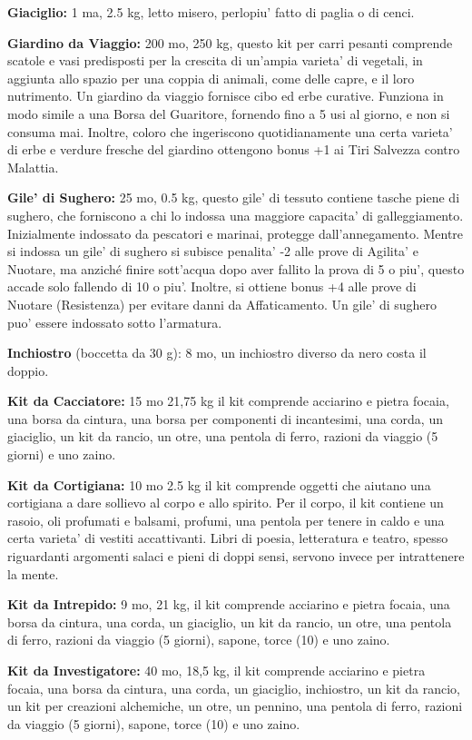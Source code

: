 \documentclass[a4paper,11pt,twoside,openany]{dndbook}
\begin{document}
{\textbf{Giaciglio:} 1 ma, 2.5 kg, letto misero, perlopiu' fatto di paglia o di cenci.

\textbf{Giardino da Viaggio:} 200 mo, 250 kg, questo kit per carri pesanti comprende scatole e vasi predispo­sti per la crescita di un'ampia varieta' di vegetali, in aggiunta allo spazio per una coppia di animali, come delle capre, e il loro nutrimento. Un giardino da viaggio fornisce cibo ed erbe curative. Funziona in modo simile a una Borsa del Guaritore, fornendo fino a 5 usi al giorno, e non si consuma mai. Inoltre, coloro che ingeriscono quotidianamente una certa varieta' di ­erbe e verdure fresche del giardino ottengono bonus +1 ai Tiri Salvezza contro Malattia. 

\textbf{Gile' di Sughero:} 25 mo, 0.5 kg, questo gile' di tessuto contiene tasche piene di sughero, che forniscono a chi lo indossa una maggiore capacita' di galleggiamento. Inizialmente indossato da pescatori e marinai, protegge dall'annegamento. Mentre si indossa un gile' di sughero si subisce penalita' -2 alle prove di Agilita' e Nuotare, ma anziché finire sott'acqua dopo aver fallito la prova di 5 o piu', questo accade solo fallendo di 10 o piu'. Inoltre, si ottiene bonus +4 alle prove di Nuotare (Resistenza) per evitare danni da Affaticamento. Un gile' di sughero puo' essere indossato sotto l'armatura.

\textbf{Inchiostro} (boccetta da 30 g): 8 mo, un inchiostro diverso da nero costa il doppio.

\textbf{Kit da Cacciatore:} 15 mo 21,75 kg il kit comprende acciarino e pietra focaia, una borsa da cin­tura, una borsa per componenti di incantesimi, una corda, un giaciglio, un kit da rancio, un otre, una pentola di ferro, razioni da viaggio (5 giorni) e uno zaino.

\textbf{Kit da Cortigiana:} 10 mo 2.5 kg il kit comprende oggetti che aiutano una cortigiana a dare sollievo al corpo e allo spirito. Per il corpo, il kit contiene un rasoio, oli profumati e balsami, profumi, una pentola per tenere in caldo e una certa varieta' di vestiti accattivanti. Libri di poesia, letteratura e teatro, spesso riguardanti argomenti salaci e pieni di doppi sensi, servono invece per intrattenere la mente.

\textbf{Kit da Intrepido:} 9 mo, 21 kg, il kit comprende acciarino e pietra focaia, una borsa da cin­tura, una corda, un giaciglio, un kit da rancio, un otre, una pentola di ferro, razioni da viaggio (5 giorni), sapone, torce (10) e uno zaino.

\textbf{Kit da Investigatore:} 40 mo, 18,5 kg, il kit comprende acciarino e pietra focaia, una borsa da cin­tura, una corda, un giaciglio, inchiostro, un kit da rancio, un kit per creazioni alchemiche, un otre, un pennino, una pentola di ferro, razioni da viaggio (5 giorni), sapone, torce (10) e uno zaino.

}
\end{document}
